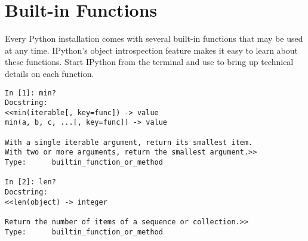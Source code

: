 \label{lab:Standard Library}


\section*{Built-in Functions}

Every Python installation comes with several built-in functions that may be used at any time.
IPython's object introspection feature makes it easy to learn about these functions.
Start IPython from the terminal and use  to bring up technical details on each function.

\begin{lstlisting}
In [1]: min?
Docstring:
<<min(iterable[, key=func]) -> value
min(a, b, c, ...[, key=func]) -> value

With a single iterable argument, return its smallest item.
With two or more arguments, return the smallest argument.>>
Type:      builtin_function_or_method

In [2]: len?
Docstring:
<<len(object) -> integer

Return the number of items of a sequence or collection.>>
Type:      builtin_function_or_method
\end{lstlisting}

